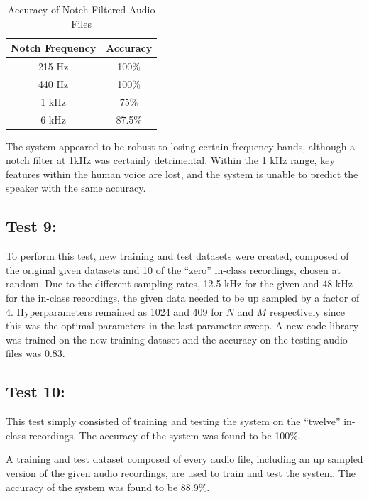 \documentclass[conference]{IEEEtran}
\begin{document}
    \begin{table}[!h]
        \centering
        \caption{Accuracy of Notch Filtered Audio Files}
        \label{notch_table}
        \begin{tabular}{|c|c|}
            \hline
            \textbf{Notch Frequency} & \textbf{Accuracy} \\
            \hline
            215 Hz & 100\% \\
            \hline
            440 Hz & 100\% \\
            \hline
            1 kHz & 75\% \\
            \hline
            6 kHz & 87.5\% \\
            \hline
        \end{tabular}
    \end{table}

    The system appeared to be robust to losing certain frequency bands, although a notch filter at 1kHz was certainly detrimental. Within the 1 kHz range, key features within the human voice are lost, and the system is unable to predict the speaker with the same accuracy.

    

    \subsection*{Test 9:}
    To perform this test, new training and test datasets were created, composed of the original given datasets and 10 of the “zero” in-class recordings, chosen at random. Due to the different sampling rates, 12.5 kHz for the given and 48 kHz for the in-class recordings, the given data needed to be up sampled by a factor of 4. Hyperparameters remained as 1024 and 409 for $N$ and $M$ respectively since this was the optimal parameters in the last parameter sweep. A new code library was trained on the new training dataset and the accuracy on the testing audio files was 0.83.

    \subsection*{Test 10:}
    This test simply consisted of training and testing the system on the “twelve” in-class recordings. The accuracy of the system was found to be 100\%.

    A training and test dataset composed of every audio file, including an up sampled version of the given audio recordings, are used to train and test the system. The accuracy of the system was found to be 88.9\%.
\end{document}

